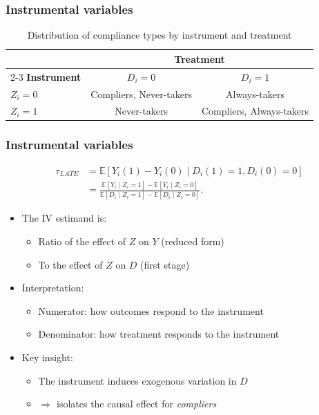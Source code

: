 \documentclass[12pt, compress]{beamer}
\begin{document}
\begin{frame}
	\frametitle{Instrumental variables}
    {\small{
\begin{table}[ht]
	\centering
	\caption{Distribution of compliance types by instrument and treatment}\label{tab:2x2}
	\begin{tabular}{lcc}
		\hline
		& \multicolumn{2}{c}{\textbf{Treatment}} \\ 
		\cline{2-3}
		\textbf{Instrument} & $D_i = 0$ & $D_i = 1$ \\ 
		\hline
		$Z_i=0$  & Compliers, Never-takers & Always-takers \\[0.25em]
		$Z_i=1$  & Never-takers & Compliers, Always-takers \\ 
		\hline
	\end{tabular}
\end{table}
}}
\end{frame}

\begin{frame}
	\frametitle{Instrumental variables}
\begin{align*}
	\tau_{LATE} 
	&= \mathbb{E}[Y_i(1)-Y_i(0)\mid D_i(1)=1, D_i(0)=0]\\
    &=\frac{\mathbb{E}[Y_i \mid Z_i = 1] - \mathbb{E}[Y_i \mid Z_i = 0]}{\mathbb{E}[D_i \mid Z_i = 1] - \mathbb{E}[D_i \mid Z_i = 0]}.
\end{align*}

\begin{itemize}
	\item The IV estimand is:
	\begin{itemize}
		\item Ratio of the effect of $Z$ on $Y$ (reduced form)
		\item To the effect of $Z$ on $D$ (first stage)
	\end{itemize}
	
	\medskip
	
	\item Interpretation:
	\begin{itemize}
		\item Numerator: how outcomes respond to the instrument
		\item Denominator: how treatment responds to the instrument
	\end{itemize}
	
	\medskip
	
	\item Key insight:
	\begin{itemize}
		\item The instrument induces exogenous variation in $D$
		\item $\Rightarrow$ isolates the causal effect for \textit{compliers}
	\end{itemize}
\end{itemize}
\end{frame}
\end{document}
